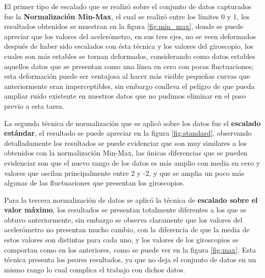 \vspace{5mm} %

El primer tipo de escalado que se realiz\'{o} sobre el conjunto de datos capturados fue la \textbf{Normalizaci\'{o}n Min-Max}, el cual se realiz\'{o} entre los l\'{i}mites 0 y 1, los resultados obtenidos se muestran en la figura \ref{fig:min_max}, donde se puede apreciar que los valores del aceler\'{o}metro, en sus tres ejes, no se veen deformados despu\'{e}s de haber sido escalados con \'{e}sta t\'{e}cnica y los valores del giroscopio, los cuales son m\'{a}s estables se tornan deformados, considerando como datos estables aquellos datos que se presentan como una l\'{i}nea en cero con pocas fluctuaciones; esta deformaci\'{o}n puede ser ventajosa al hacer m\'{a}s visible peque\~{n}as curvas que anteriormente eran imperceptibles, sin embargo conlleva el peligro de que pueda ampliar ruido existente en nuestros datos que no pudimos eliminar en el paso previo a esta tarea.


\vspace{5mm} %

La segunda t\'{e}cnica de normalizaci\'{o}n que se aplic\'{o} sobre los datos fue el \textbf{escalado est\'{a}ndar}, el resultado se puede apreciar en la figura \ref{fig:standard}, observando detalladamente los resultados se puede evidenciar que son muy similares a los obtenidos con la normalizaci\'{o}n Min-Max, las \'{u}nicas diferencias que se pueden evidenciar son que el nuevo rango de los datos es m\'{a}s amplio con media en cero y valores que oscilan principalmente entre 2 y -2,  y que se amplia un poco m\'{a}s algunas de las fluctuaciones que presentan los giroscopios.

\vspace{5mm} %

Para la tercera normalizaci\'{o}n de datos se aplic\'{o} la t\'{e}cnica de \textbf{escalado sobre el valor m\'{a}ximo}, los resultados se presentan totalmente diferentes a los que se obtuvo anteriormente, sin embargo se observa claramente que los valores del aceler\'{o}metro no presentan mucho cambio, con la diferencia de que la media de estos valores son distintas para cada uno, y los valores de los giroscopios se comportan como en los anteriores, como se puede ver en la figura \ref{fig:max}. Esta t\'{e}cnica presenta los peores resultados, ya que no deja el conjunto de datos en un mismo rango lo cual complica el trabajo con dichos datos.

\vspace{5mm} %

